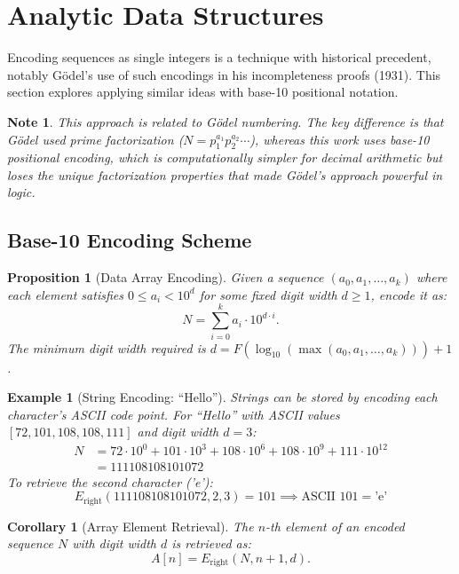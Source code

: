 \documentclass[12pt, a4paper]{article}
\theoremstyle{note}
\newtheorem*{note}{Note}
\newtheorem{corollary}[theorem]{Corollary}
\newtheorem{proposition}[theorem]{Proposition}
\newtheorem{example}[theorem]{Example}
\begin{document}
\section{Analytic Data Structures}
\label{sec:arrays}

Encoding sequences as single integers is a technique with historical precedent, notably Gödel's use of such encodings in his incompleteness proofs (1931). This section explores applying similar ideas with base-10 positional notation.

\begin{note}
This approach is related to Gödel numbering. The key difference is that Gödel used prime factorization (\(N = p_1^{a_1} p_2^{a_2} \cdots\)), whereas this work uses base-10 positional encoding, which is computationally simpler for decimal arithmetic but loses the unique factorization properties that made Gödel's approach powerful in logic.
\end{note}

\subsection{Base-10 Encoding Scheme}

\begin{proposition}[Data Array Encoding]\label{prop:encoding}
Given a sequence $(a_0, a_1, \dots, a_k)$ where each element satisfies $0 \leq a_i < 10^{d}$ for some fixed digit width $d \geq 1$, encode it as:
\[
N = \sum_{i=0}^{k} a_i \cdot 10^{d \cdot i}.
\]
The minimum digit width required is $d = F(\log_{10}(\max(a_0, a_1, \dots, a_k))) + 1$.
\end{proposition}

\begin{example}[String Encoding: ``Hello'']
Strings can be stored by encoding each character's ASCII code point. For ``Hello'' with ASCII values $[72, 101, 108, 108, 111]$ and digit width $d=3$:
\begin{align*}
N &= 72 \cdot 10^{0} + 101 \cdot 10^{3} + 108 \cdot 10^{6} + 108 \cdot 10^{9} + 111 \cdot 10^{12} \\
  &= 111108108101072
\end{align*}
To retrieve the second character ('e'):
\[
E_{\text{right}}(111108108101072, 2, 3) = 101 \implies \text{ASCII } 101 = \text{'e'}
\]
\end{example}

\begin{corollary}[Array Element Retrieval]\label{cor:indexing}
The $n$-th element of an encoded sequence $N$ with digit width $d$ is retrieved as:
\[
A[n] = E_{\text{right}}(N, n+1, d).
\]
\end{corollary}
\end{document}
